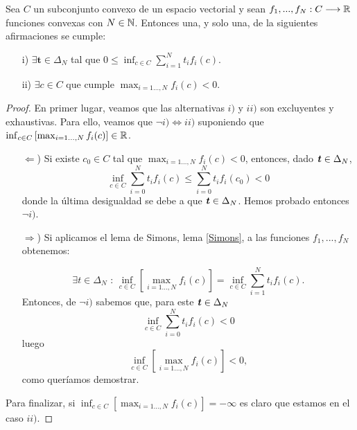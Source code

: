 	\begin{teoremaBox}\label{Gordan}
		Sea $ C $ un subconjunto convexo de un espacio vectorial y sean $ f_1,...,f_N : C \longrightarrow \mathbb{R} $ funciones convexas con $ N \in \mathbb{N} $. Entonces una, y solo una, de la siguientes afirmaciones se cumple:
		\begin{itemize}
			\item[i)] $ \exists \mathbf{t} \in \Delta_N $ tal que $ 0 \leq \displaystyle \inf_{c\in C}  \sum_{i=1}^{N}{t_i f_i (c)}$.
			\item[ii)] $ \exists c \in C $ que cumple $\displaystyle \max_{i=1\dots,N } f_i(c) < 0 $.
		\end{itemize}
	\end{teoremaBox}
	\begin{proof}
		En primer lugar, veamos que las alternativas $ i)$ y $ ii) $ son excluyentes y exhaustivas. Para ello, veamos que $ \neg i) \Longleftrightarrow ii) $ suponiendo que $  \inf_{ c\in C}\left[\max_{i=1\dots,N } f_i(c) \right] \in \mathbb{R} $.
		
		\begin{itemize}
		\item [$ \Leftarrow $)] Si existe $ c_0 \in C $ tal que $ \max_{i=1\dots,N } f_i(c) < 0 $, entonces, dado $ \textbf{\emph{t}} \in \Delta_N $,
		\[
		\inf_{ c \in C} \sum_{i=0}^{N}t_i f_i(c) \leq \sum_{i=0}^{N}t_i f_i(c_0) < 0
		\]
		donde la última desigualdad se debe a que $ \textbf{\emph{t}} \in \Delta_N $. Hemos probado entonces $ \neg i) $.
		\item[$ \Rightarrow $)] 	Si aplicamos el lema de Simons, lema \ref{Simons}, a las funciones $ f_1,...,f_N $ obtenemos:
		
		\begin{equation*}
		\exists t \in \Delta_N \text{ : } \inf_{ c\in C}\left[\max_{i=1\dots,N } f_i(c) \right] = \inf_{c \in C} \sum_{i=1}^{N}t_i f_i (c).
		\end{equation*}
		Entonces, de $ \neg i) $ sabemos que, para este $ \textbf{\emph{t}} \in \Delta_N $
		\[
		\inf_{ c \in C} \sum_{i=0}^{N}t_i f_i(c) < 0
		\]
		luego
		\[
		\inf_{ c\in C}\left[\max_{i=1\dots,N } f_i(c) \right] < 0,
		\]
		como queríamos demostrar.
		
		\end{itemize}
		
		Para finalizar, si $  \inf_{ c\in C}\left[\max_{i=1\dots,N } f_i(c) \right] =-\infty $ es claro que estamos en el caso $ ii) $.
	\end{proof}

